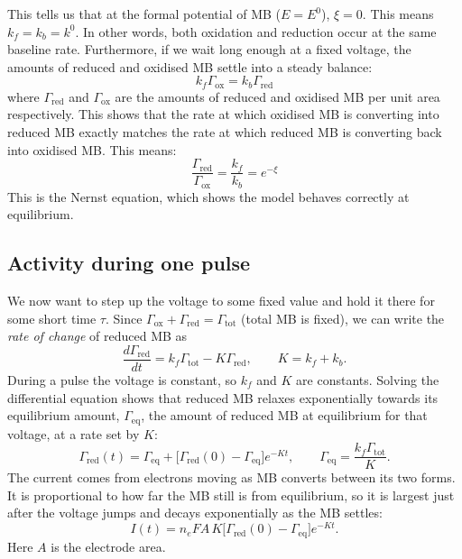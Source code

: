 \documentclass[10pt,a4paper]{article}
\numberwithin{equation}{section}
\newcommand{\Gtot}{\Gamma_{\mathrm{tot}}}
\newcommand{\Gred}{\Gamma_{\mathrm{red}}}
\newcommand{\Gox}{\Gamma_{\mathrm{ox}}}
\newcommand{\Geq}{\Gamma_{\mathrm{eq}}}
\begin{document}
This tells us that at the formal potential of MB ($E = E^0$), $\xi = 0$. This means $k_f = k_b = k^0$. In other words, both oxidation and reduction occur at the same baseline rate. Furthermore, if we wait long enough at a fixed voltage, the amounts of reduced and oxidised MB settle into a steady balance:
\[ k_f\Gox = k_b\Gred \]
where $\Gred$ and $\Gox$ are the amounts of reduced and oxidised MB per unit area respectively. This shows that the rate at which oxidised MB is converting into reduced MB exactly matches the rate at which reduced MB is converting back into oxidised MB. This means:
\[ \frac{\Gred}{\Gox} = \frac{k_f}{k_b} = e^{-\xi} \]
This is the Nernst equation, which shows the model behaves correctly at equilibrium.

\subsection{Activity during one pulse}
We now want to step up the voltage to some fixed value and hold it there for some short time $\tau$. Since $\Gox + \Gred = \Gtot$ (total MB is fixed), we can write the \emph{rate of change} of reduced MB as
\[ \frac{d\Gred}{dt} = k_f\Gtot - K\Gred, \qquad K = k_f + k_b. \]
During a pulse the voltage is constant, so $k_f$ and $K$ are constants. Solving the differential equation shows that reduced MB relaxes exponentially towards its equilibrium amount, $\Geq$, the amount of reduced MB at equilibrium for that voltage, at a rate set by $K$:
\[ \Gred(t) = \Geq + \big[\Gred(0) - \Geq\big]e^{-Kt}, \qquad \Geq = \frac{k_f\Gtot}{K}. \]
The current comes from electrons moving as MB converts between its two forms. It is proportional to how far the MB still is from equilibrium, so it is largest just after the voltage jumps and decays exponentially as the MB settles:
\[ I(t) = n_eFA\,K\big[\Gred(0) - \Geq\big]e^{-Kt}. \]
Here $A$ is the electrode area.
\end{document}
